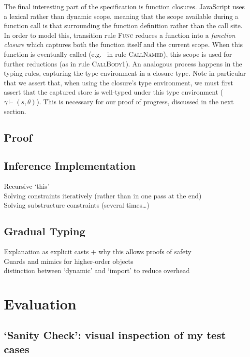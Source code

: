 \documentclass[12pt,a4paper,twoside,openright]{report}
\begin{document}
The final interesting part of the specification is function closures.
JavaScript uses a lexical rather than dynamic scope, meaning that the scope
available during a function call is that surrounding the function definition
rather than the call site. In order to model this, transition rule
\textsc{Func} reduces a function into a \textit{function closure} which
captures both the function itself and the current scope. When this function is
eventually called (e.g.~ in rule \textsc{CallNamed}), this scope is used for
further reductions (as in rule \textsc{CallBody1}). An analogous process
happens in the typing rules, capturing the type environment in a closure type.
Note in particular that we assert that, when using the closure's type
environment, we must first assert that the captured store is well-typed under
this type environment ($\gamma \vdash (s, \theta)$). This is necessary for our
proof of progress, discussed in the next section.

\section{Proof}

\section{Inference Implementation}
Recursive `this' \\
Solving constraints iteratively (rather than in one pass at the end) \\
Solving substructure constraints (several times\ldots) \\

\section{Gradual Typing}
Explanation as explicit casts + why this allows proofs of safety \\
Guards and mimics for higher-order objects \\
distinction between `dynamic' and `import' to reduce overhead \\

\printbibliography{}

\chapter{Evaluation}\label{evaluation}
\section{`Sanity Check': visual inspection of my test cases}
\end{document}
